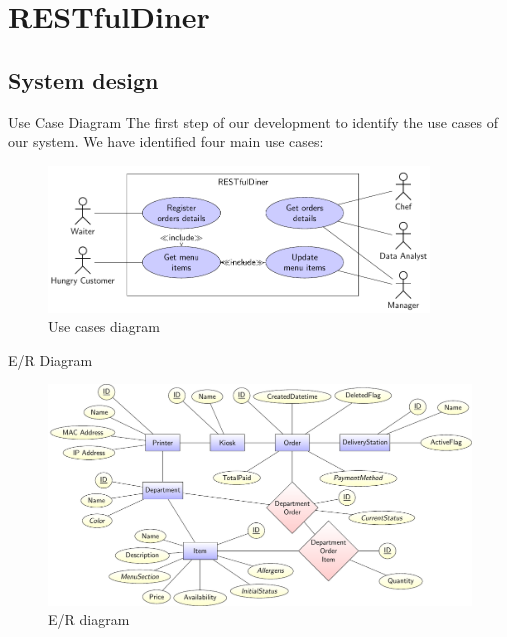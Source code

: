

\section[RESTfulDiner]{RESTfulDiner}

\subsection[System design]{System design}

\begin{frame}{Use Case Diagram}
	The first step of our development to identify the use cases of our system.
	We have identified four main use cases:

	\begin{figure}[h!]
		\centering
		\includegraphics[width=0.9\textwidth,height=0.75\textheight,keepaspectratio]{images/usecases}
		\caption{Use cases diagram}
		\label{fig:usecases}
	\end{figure}

\end{frame}

\begin{frame}{E/R Diagram}
	\begin{figure}[h!]
		\centering
		\includegraphics[width=\textwidth,height=0.75\textheight,keepaspectratio]{images/er}
		\caption{E/R diagram}
		\label{fig:er}
	\end{figure}

\end{frame}

